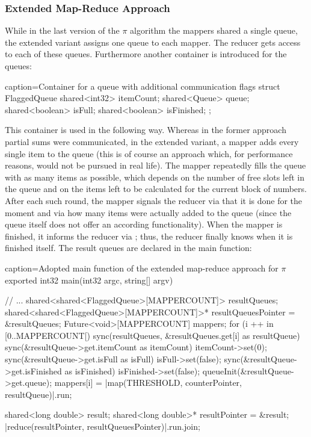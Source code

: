 \subsubsection{Extended Map-Reduce Approach}
While in the last version of the $\pi$ algorithm the mappers shared a single queue, the extended variant assigns one queue to each mapper. The reducer gets access to each of these queues. Furthermore another container is introduced for the queues:
\begin{ccode}{caption=Container for a queue with additional communication flags}
struct FlaggedQueue { 
  shared<int32> itemCount; 
  shared<Queue> queue; 
  shared<boolean> isFull; 
  shared<boolean> isFinished; 
};
\end{ccode}
This container is used in the following way. Whereas in the former approach partial sums were communicated, in the extended variant, a mapper adds every single item to the queue (this is of course an approach which, for performance reasons, would not be pursued in real life). The mapper repeatedly fills the queue with as many items as possible, which depends on the number of free slots left in the queue and on the items left to be calculated for the current block of numbers. After each such round, the mapper signals the reducer via  that it is done for the moment and via  how many items were actually added to the queue (since the queue itself does not offer an according functionality). When the mapper is finished, it informs the reducer via ; thus, the reducer finally knows when it is finished itself. The result queues are declared in the main function:
\begin{ccode}{caption=Adopted main function of the extended map-reduce approach for $\pi$}
exported int32 main(int32 argc, string[] argv) { 
  // ...
  shared<shared<FlaggedQueue>[MAPPERCOUNT]> resultQueues; 
  shared<shared<FlaggedQueue>[MAPPERCOUNT]>* resultQueuesPointer = &resultQueues; 
  Future<void>[MAPPERCOUNT] mappers; 
  for (i ++ in [0..MAPPERCOUNT[) { 
    sync(resultQueues, &resultQueues.get[i] as resultQueue) { 
      sync(&resultQueue->get.itemCount as itemCount) { itemCount->set(0); } 
      sync(&resultQueue->get.isFull as isFull) { isFull->set(false); } 
      sync(&resultQueue->get.isFinished as isFinished) { isFinished->set(false); } 
      queueInit(&resultQueue->get.queue); 
      mappers[i] = |map(THRESHOLD, counterPointer, resultQueue)|.run; 
    } 
  }
   
  shared<long double> result; 
  shared<long double>* resultPointer = &result; 
  |reduce(resultPointer, resultQueuesPointer)|.run.join; 
}
\end{ccode}
